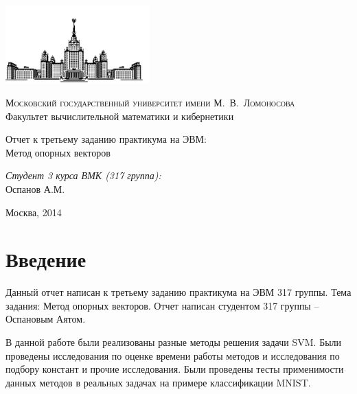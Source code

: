 \documentclass[12pt, a4paper]{article}
\begin{document}
	\thispagestyle{empty}

	\begin{singlespace}
	\begin{titlepage}
		\begin{center}
			\includegraphics[height = 3cm]{msu.png}

			{\scshape Московский государственный университет имени М.~В.~Ломоносова}\\
			Факультет вычислительной математики и кибернетики\\
			\centerline{\hfill\hrulefill\hrulefill\hrulefill\hrulefill\hfill}

			\vfill

			{\LARGE Отчет к третьему заданию практикума на ЭВМ: \\ Метод опорных векторов}

			\vspace{1cm}

		\end{center}

		\vfill
		\begin{flushright}
			\textit{Студент 3 курса ВМК (317 группа):}\\
				Оспанов А.М.

			\vspace{5mm}

		\end{flushright}

		\vfill

		\begin{center}
		Москва, 2014
		\end{center}
	\end{titlepage}
	\end{singlespace}

	\tableofcontents


	\newpage
	\section{Введение}
		Данный отчет написан к третьему заданию практикума на ЭВМ 317 группы. Тема задания: Метод опорных векторов. Отчет написан студентом 317 группы -- Оспановым Аятом.

		В данной работе были реализованы разные методы решения задачи SVM. Были проведены исследования по оценке времени работы методов и исследования по подбору констант и прочие исследования. Были проведены тесты применимости данных методов в реальных задачах на примере классификации MNIST.
\end{document}
